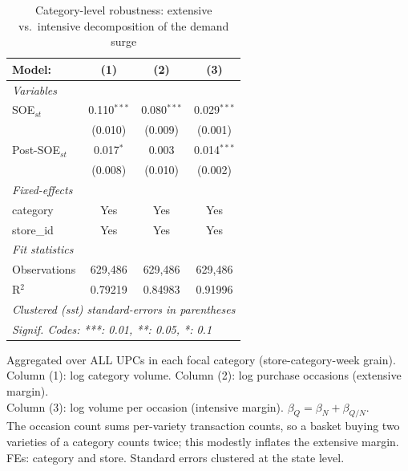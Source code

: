 
\begin{table}[htbp]
   \caption{\label{tab:category_decomp} Category-level robustness: extensive vs.\ intensive decomposition of the demand surge}
   \centering
   \begin{tabular}{lccc}
      \tabularnewline \midrule \midrule
      Model:          & (1)           & (2)           & (3)\\  
      \midrule
      \emph{Variables}\\
      SOE$_{st}$      & 0.110$^{***}$ & 0.080$^{***}$ & 0.029$^{***}$\\   
                      & (0.010)       & (0.009)       & (0.001)\\   
      Post-SOE$_{st}$ & 0.017$^{*}$   & 0.003         & 0.014$^{***}$\\   
                      & (0.008)       & (0.010)       & (0.002)\\   
      \midrule
      \emph{Fixed-effects}\\
      category        & Yes           & Yes           & Yes\\  
      store\_id       & Yes           & Yes           & Yes\\  
      \midrule
      \emph{Fit statistics}\\
      Observations    & 629,486       & 629,486       & 629,486\\  
      R$^2$           & 0.79219       & 0.84983       & 0.91996\\  
      \midrule \midrule
      \multicolumn{4}{l}{\emph{Clustered (sst) standard-errors in parentheses}}\\
      \multicolumn{4}{l}{\emph{Signif. Codes: ***: 0.01, **: 0.05, *: 0.1}}\\
   \end{tabular}
   
   \par \raggedright 
   Aggregated over ALL UPCs in each focal category (store-category-week grain).\\
   Column (1): log category volume. Column (2): log purchase occasions (extensive margin).\\
   Column (3): log volume per occasion (intensive margin). $\beta_Q = \beta_N + \beta_{Q/N}$.\\
   The occasion count sums per-variety transaction counts, so a basket buying two\\
   varieties of a category counts twice; this modestly inflates the extensive margin.\\
   FEs: category and store. Standard errors clustered at the state level.
\end{table}


